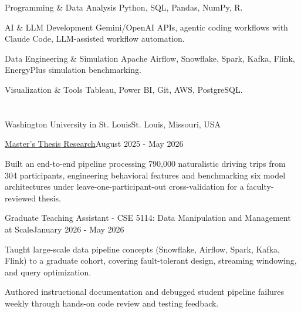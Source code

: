 \documentclass[10pt, letterpaper]{article}
\begin{document}
\vspace{\entrySpacing}
\begin{skillcategory}{Programming \& Data Analysis}
	Python, SQL, Pandas, NumPy, R.
\end{skillcategory}

\vspace{\entrySpacing}
\begin{skillcategory}{AI \& LLM Development}
	Gemini/OpenAI APIs, agentic coding workflows with Claude Code, LLM-assisted workflow automation.
\end{skillcategory}

\vspace{\entrySpacing}
\begin{skillcategory}{Data Engineering \& Simulation}
	Apache Airflow, Snowflake, Spark, Kafka, Flink, EnergyPlus simulation benchmarking.
\end{skillcategory}

\vspace{\entrySpacing}
\begin{skillcategory}{Visualization \& Tools}
	Tableau, Power BI, Git, AWS, PostgreSQL.
\end{skillcategory}

\vspace{\headerSpacing}


\section{}

\vspace{\entrySpacing}
\begin{leadershipentry}{Washington University in St. Louis}{St. Louis, Missouri, USA}
	\begin{positionentry}{\href{https://agreddy.com/projects/ms-thesis}{Master's Thesis Research}}{August 2025 - May 2026}
		\item Built an end-to-end pipeline processing 790,000 naturalistic driving trips from 304 participants, engineering behavioral features and benchmarking six model architectures under leave-one-participant-out cross-validation for a faculty-reviewed thesis.
	\end{positionentry}
	\begin{positionentry}{Graduate Teaching Assistant - CSE 5114: Data Manipulation and Management at Scale}{January 2026 - May 2026}
		\item Taught large-scale data pipeline concepts (Snowflake, Airflow, Spark, Kafka, Flink) to a graduate cohort, covering fault-tolerant design, streaming windowing, and query optimization.
		\item Authored instructional documentation and debugged student pipeline failures weekly through hands-on code review and testing feedback.
	\end{positionentry}
\end{leadershipentry}
\end{document}

